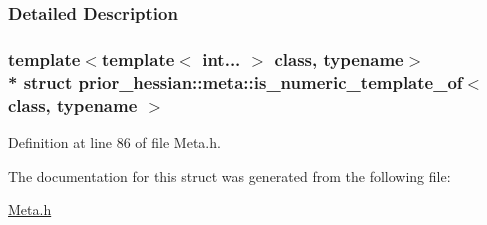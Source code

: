 \subsubsection{Detailed Description}
\subsubsection*{template$<$template$<$ int... $>$ class, typename$>$\\*
struct prior\+\_\+hessian\+::meta\+::is\+\_\+numeric\+\_\+template\+\_\+of$<$ class, typename $>$}



Definition at line 86 of file Meta.\+h.



The documentation for this struct was generated from the following file\+:\begin{DoxyCompactItemize}
\item 
\hyperlink{Meta_8h}{Meta.\+h}\end{DoxyCompactItemize}
